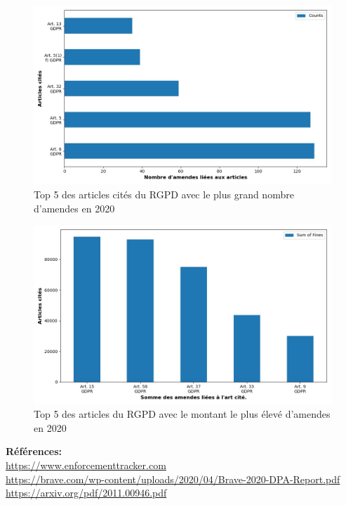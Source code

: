 \documentclass[french]{article}
\begin{document}
	\begin{multicols}{2}
	\begin{figure}
		[H]\centering\includegraphics[width=1.0\linewidth]{graphs/top10_quoted_year}
		\caption{Top 5 des articles cités du RGPD avec le plus grand nombre d'amendes en 2020}
	\end{figure}
	\begin{figure}
		[H]\centering\includegraphics[width=1\linewidth]{graphs/top10_quoted_year_fines}
		\caption{Top 5 des articles  du RGPD avec le montant le plus élevé d'amendes en 2020}
	 \end{figure}
	
	\end{multicols}









\vspace*{\fill}
\textbf{Références:}\\
\href{https://www.enforcementtracker.com}{https://www.enforcementtracker.com}\\
\href{https://brave.com/wp-content/uploads/2020/04/Brave-2020-DPA-Report.pdf}{https://brave.com/wp-content/uploads/2020/04/Brave-2020-DPA-Report.pdf}\\
\href{https://arxiv.org/pdf/2011.00946.pdf}{https://arxiv.org/pdf/2011.00946.pdf}
\end{document}
